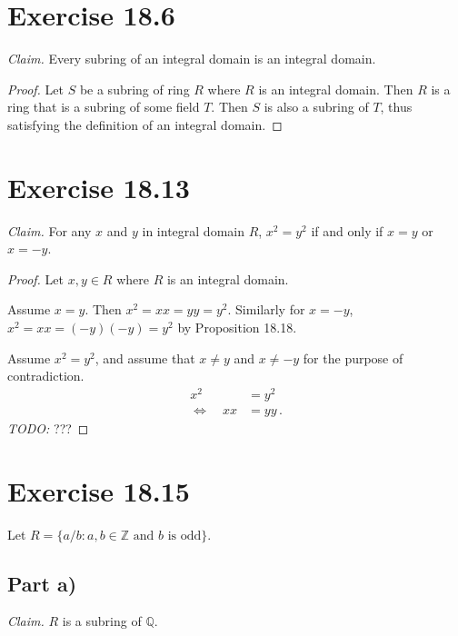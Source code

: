 \documentclass{abrice}
\newcommand{\Z}{\mathbb{Z}}
\newcommand{\Q}{\mathbb{Q}}
\begin{document}
\section{Exercise 18.6}

\emph{Claim.} Every subring of an integral domain is an integral domain.

\begin{proof}
  Let $S$ be a subring of ring $R$ where $R$ is an integral domain. Then $R$ is
  a ring that is a subring of some field $T$. Then $S$ is also a subring of $T$,
  thus satisfying the definition of an integral domain.
\end{proof}

\section{Exercise 18.13}

\emph{Claim.} For any $x$ and $y$ in integral domain $R$, $x^2 = y^2$ if and
only if $x = y$ or $x = -y$.

\begin{proof}
  Let $x,y \in R$ where $R$ is an integral domain.

  Assume $x = y$. Then $x^2 = xx = yy = y^2$. Similarly for $x = -y$, $x^2 = xx
  = (-y)(-y) = y^2$ by Proposition 18.18.

  Assume $x^2 = y^2$, and assume that $x \neq y$ and $x \neq -y$ for the purpose
  of contradiction.
  \begin{align*}
    x^2 &= y^2 \\
    \Longleftrightarrow \quad xx &= yy\, .
  \end{align*}
  \emph{TODO:} ???
\end{proof}

\section{Exercise 18.15}

Let $R = \{a/b : a,b \in \Z \text{ and } b \text{ is odd}\}$.

\subsection{Part a)}

\emph{Claim.} $R$ is a subring of $\Q$.
\end{document}
